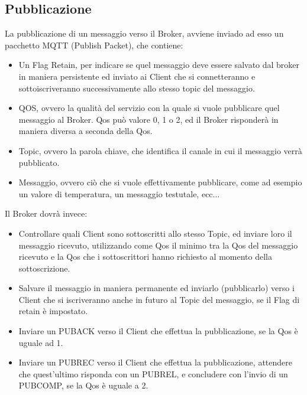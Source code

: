 \documentclass{article}
\begin{document}
\subsection{Pubblicazione}
La pubblicazione di un messaggio verso il Broker, avviene inviado ad esso un pacchetto MQTT (Publish Packet), che contiene:
\begin{itemize}
	\item Un Flag Retain, per indicare se quel messaggio deve essere salvato dal broker in maniera persistente ed inviato ai Client che si connetteranno e sottoiscriveranno successivamente allo stesso topic del messaggio.
	\item QOS, ovvero la qualità del servizio con la quale si vuole pubblicare quel messaggio al Broker. Qos può valore 0, 1 o 2, ed il Broker risponderà in maniera diversa a seconda della Qos. 
	\item Topic, ovvero la parola chiave, che identifica il canale in cui il messaggio verrà pubblicato.
	\item Messaggio, ovvero ciò che si vuole effettivamente pubblicare, come ad esempio un valore di temperatura, un messaggio testutale, ecc...
\end{itemize}
Il Broker dovrà invece:
\begin{itemize}
	\item Controllare quali Client sono sottoscritti allo stesso Topic, ed inviare loro il messaggio ricevuto, utilizzando come Qos il minimo tra la Qos del messaggio ricevuto e la Qos che i sottoscrittori hanno richiesto al momento della sottoscrizione.
	\item Salvare il messaggio in maniera permanente ed inviarlo (pubblicarlo) verso i Client che si iscriveranno anche in futuro al Topic del messaggio, se il Flag di retain è impostato.
	\item Inviare un PUBACK verso il Client che effettua la pubblicazione, se la Qos è uguale ad 1.
	\item Inviare un PUBREC verso il Client che effettua la pubblicazione, attendere che quest'ultimo risponda con un PUBREL, e concludere con l'invio di un PUBCOMP, se la Qos è uguale a 2.
\end{itemize}
\end{document}
